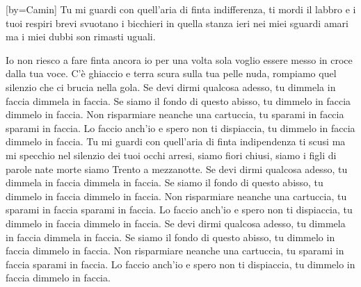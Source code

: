 [by={Camin}]
\chordsoff
\beginverse
Tu mi guardi con quell'aria di finta indifferenza,
ti mordi il labbro 
e i tuoi respiri brevi svuotano i bicchieri 
in quella stanza ieri nei miei sguardi amari 
ma i miei dubbi son rimasti uguali. 

Io non riesco a fare finta ancora 
io per una volta sola 
voglio essere messo in croce dalla tua voce. 
C'è ghiaccio e terra scura sulla tua pelle nuda, 
rompiamo quel silenzio che ci brucia nella gola. 
\endverse
\beginchorus
Se devi dirmi qualcosa adesso, 
tu dimmela in faccia dimmela in faccia. 
Se siamo il fondo di questo abisso, 
tu dimmelo in faccia dimmelo in faccia. 
Non risparmiare neanche una cartuccia, 
tu sparami in faccia sparami in faccia. 
Lo faccio anch'io e spero non ti dispiaccia, 
tu dimmelo in faccia dimmelo in faccia.
\endchorus
\beginverse
Tu mi guardi con quell'aria di finta indipendenza 
ti scusi ma mi specchio nel silenzio dei tuoi occhi arresi, 
siamo fiori chiusi, 
siamo i figli di parole nate morte 
siamo Trento a mezzanotte.
\endverse
\beginchorus
Se devi dirmi qualcosa adesso, 
tu dimmela in faccia dimmela in faccia. 
Se siamo il fondo di questo abisso, 
tu dimmelo in faccia dimmelo in faccia. 
Non risparmiare neanche una cartuccia, 
tu sparami in faccia sparami in faccia. 
Lo faccio anch'io e spero non ti dispiaccia, 
tu dimmelo in faccia dimmelo in faccia.
\endchorus
\beginchorus
Se devi dirmi qualcosa adesso, 
tu dimmela in faccia dimmela in faccia. 
Se siamo il fondo di questo abisso, 
tu dimmelo in faccia dimmelo in faccia. 
Non risparmiare neanche una cartuccia, 
tu sparami in faccia sparami in faccia. 
Lo faccio anch'io e spero non ti dispiaccia, 
tu dimmelo in faccia dimmelo in faccia.
\endchorus
\endsong
